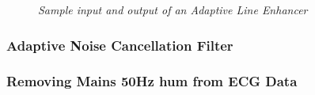 \documentclass[./main.tex]{subfiles}
\begin{document}
\begin{figure}[h]
\centering 
\resizebox{\textwidth}{!}{}
\caption{\textit{Sample input and output of an Adaptive Line Enhancer}}
\label{fig:3_3_b_overview}
\end{figure}


\subsubsection{Adaptive Noise Cancellation Filter}


\subsubsection{Removing Mains 50Hz hum from ECG Data}


%  	


 		
         
 		
\end{document}
